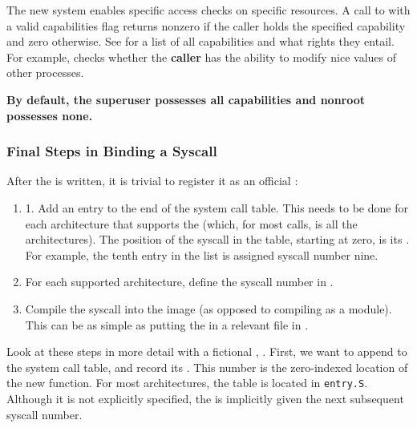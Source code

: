The new system enables specific access checks on specific resources.
A call to  with a valid capabilities flag returns nonzero if the caller holds the specified capability and zero otherwise.
See  for a list of all capabilities and what rights they entail.
For example,  checks whether the \textbf{caller} has the ability to modify nice values of other processes.

\begin{blackbox}
  \large{\textbf{By default, the superuser possesses all capabilities and nonroot possesses none.}}
\end{blackbox}

\subsubsection{Final Steps in Binding a Syscall}\label{subsec:Final_Steps_Binding_Syscall}
After the  is written, it is trivial to register it as an official :
\begin{enumerate}[noitemsep]
\item 1. Add an entry to the end of the system call table.
  This needs to be done for each architecture that supports the  (which, for most calls, is all the architectures).
  The position of the syscall in the table, starting at zero, is its .
  For example, the tenth entry in the list is assigned syscall number nine.
\item For each supported architecture, define the syscall number in .
\item Compile the syscall into the  image (as opposed to compiling as a module).
  This can be as simple as putting the  in a relevant file in .
\end{enumerate}

Look at these steps in more detail with a fictional , .
First, we want to append  to the system call table, and record its .
This number is the zero-indexed location of the new  function.
For most architectures, the table is located in \texttt{entry.S}.
Although it is not explicitly specified, the  is implicitly given the next subsequent syscall number.

